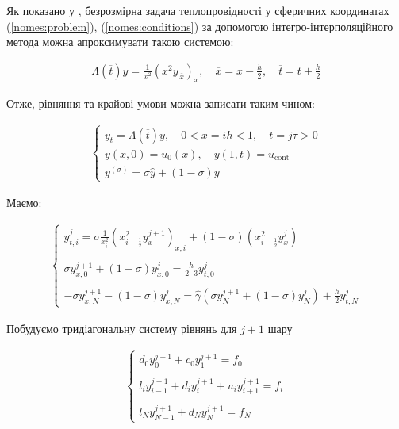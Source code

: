 Як показано у \cite[с. 185-208]{Samarskii71}, безрозмірна задача теплопровідності у сферичних координатах (\ref{nomes:problem}), (\ref{nomes:conditions}) за допомогою інтегро-інтерполяційного метода можна апроксимувати такою системою:

\begin{equation}
\begin{multlined} \label{nomes:approx}
\Lambda(\overline{t}) y = \frac{1}{x^2}\left(x^2 y_{\,\overline{x}}\right)_x, \quad \overline{x} = x - \frac{h}{2}, \quad \overline{t} = t + \frac{h}{2}
\end{multlined}
\end{equation}

Отже, рівняння та крайові умови можна записати таким чином:

\begin{align}
\left\{\begin{array}{c}
y_t = \Lambda(\overline{t})y, \quad 0 < x = ih < 1, \quad t = j\tau > 0\\
y(x, 0) = u_0(x), \quad y(1, t) = u_\text{cont}\\
y^{(\sigma)} = \sigma\hat{y} + (1 - \sigma)y
\end{array}\right.
\end{align}

Маємо:

\begin{align} \label{diff:approx}
\left\{\begin{array}{c}
y_{t, i}^j = \sigma \frac{1}{x_i^2}\left( x_{i-\frac{1}{2}}^2 y_{\overline{x}}^{j+1}\right)_{x, i} + (1-\sigma)\left( x_{i-\frac{1}{2}}^2 y_{\overline{x}}^j\right) \\ \\
\sigma y_{x, 0}^{j+1} + (1-\sigma)y_{x, 0}^j = \frac{h}{2 \cdot 3} y_{t, 0}^j \\\\
-\sigma y_{x, N}^{j+1} - (1 -\sigma)y_{x, N}^j = \hat{\gamma} \left( \sigma y_{N}^{j+1} + (1-\sigma)y_N^j\right) + \frac{h}{2}y_{t, N}^j
\end{array}\right. 
\end{align}

Побудуємо тридіагональну систему рівнянь для \( j+1\) шару

\begin{align} \label{diff:approx}
\left\{\begin{array}{c}
d_0y_0^{j+1} + c_0y_1^{j+1} = f_0\\\\
l_iy_{i-1}^{j+1} + d_iy_i^{j+1} + u_iy_{i+1}^{j+1} = f_i\\\\
l_Ny_{N-1}^{j+1} + d_Ny_N^{j+1} = f_N
\end{array}\right. 
\end{align}

